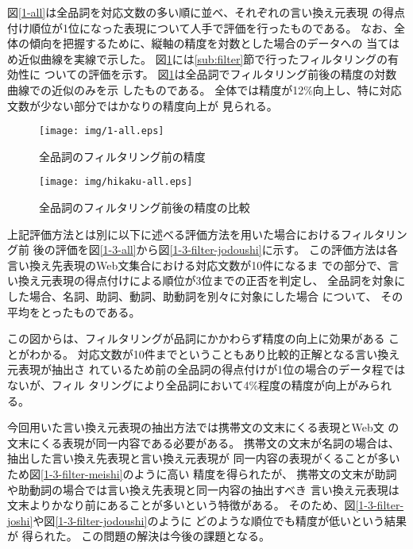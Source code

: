 \documentclass[jnlpbbl]{jnlp_j}
\begin{document}
図\ref{1-all}は全品詞を対応文数の多い順に並べ、それぞれの言い換え元表現
の得点付け順位が1位になった表現について人手で評価を行ったものである。
なお、全体の傾向を把握するために、縦軸の精度を対数とした場合のデータへの
当てはめ近似曲線を実線で示した。
図\ref{hikaku-all}には\ref{sub:filter}節で行ったフィルタリングの有効性に
ついての評価を示す。
図\ref{hikaku-all}は全品詞でフィルタリング前後の精度の対数曲線での近似のみを示
したものである。
全体では精度が12\%向上し、特に対応文数が少ない部分ではかなりの精度向上が
見られる。

\begin{figure}[htbp]
 \begin{minipage}{0.5\hsize}
  \begin{center}
   \texttt{[image: img/1-all.eps]}
  \end{center}
  \caption{全品詞のフィルタリング前の精度}
  \label{1-all}
 \end{minipage}
 \begin{minipage}{0.5\hsize}
  \begin{center}
   \texttt{[image: img/hikaku-all.eps]}
  \end{center}
  \caption{全品詞のフィルタリング前後の精度の比較}
  \label{hikaku-all}
 \end{minipage}
\end{figure}

上記評価方法とは別に以下に述べる評価方法を用いた場合におけるフィルタリング前
後の評価を図\ref{1-3-all}から図\ref{1-3-filter-jodoushi}に示す。
この評価方法は各言い換え先表現のWeb文集合における対応文数が10件になるま
での部分で、言い換え元表現の得点付けによる順位が3位までの正否を判定し、
全品詞を対象にした場合、名詞、助詞、動詞、助動詞を別々に対象にした場合
について、
その平均をとったものである。

この図からは、フィルタリングが品詞にかかわらず精度の向上に効果がある
ことがわかる。
対応文数が10件までということもあり比較的正解となる言い換え元表現が抽出さ
れているため前の全品詞の得点付けが1位の場合のデータ程ではないが、フィル
タリングにより全品詞において4\%程度の精度が向上がみられる。

今回用いた言い換え元表現の抽出方法では携帯文の文末にくる表現とWeb文
の文末にくる表現が同一内容である必要がある。
携帯文の文末が名詞の場合は、抽出した言い換え先表現と言い換え元表現が
同一内容の表現がくることが多いため図\ref{1-3-filter-meishi}のように高い
精度を得られたが、
携帯文の文末が助詞や助動詞の場合では言い換え先表現と同一内容の抽出すべき
言い換え元表現は文末よりかなり前にあることが多いという特徴がある。
そのため、図\ref{1-3-filter-joshi}や図\ref{1-3-filter-jodoushi}のように
どのような順位でも精度が低いという結果が
得られた。
この問題の解決は今後の課題となる。
\end{document}
